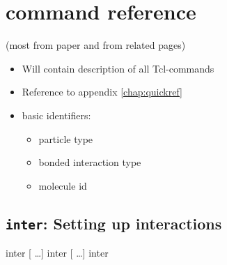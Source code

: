 \chapter{\es{} command reference}
\label{chap:ref}

(most from paper and from related pages)

\begin{itemize}
\item Will contain description of all Tcl-commands
\item Reference to appendix \vref{chap:quickref}
\item basic identifiers:
  \begin{itemize}
  \item particle type
  \item bonded interaction type
  \item molecule id
  \end{itemize}
\end{itemize}


\section{\texttt{inter}: Setting up interactions}
\label{sec:inter}
\begin{syntax}
  {inter 
    [ \ldots ]
  }
  {inter 
      [
    \ldots ]
  }
  {inter}
\end{syntax}




